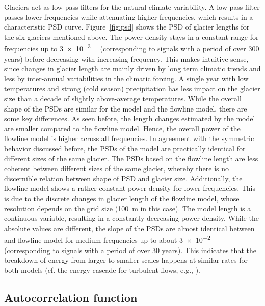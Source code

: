       Glaciers act as low-pass filters for the natural climate variability. A low pass filter passes lower frequencies while attenuating higher frequencies, which results in a characteristic PSD curve. Figure~\ref{fig:psd} shows the PSD of glacier lengths for the six glaciers mentioned above. The power density stays in a constant range for frequencies up to \SI{3e-3}{\per\year} (corresponding to signals with a period of over 300 years) before decreasing with increasing frequency. This makes intuitive sense, since changes in glacier length are mainly driven by long term climatic trends and less by inter-annual variabilities in the climatic forcing. A single year with low temperatures and strong (cold season) precipitation has less impact on the glacier size than a decade of slightly above-average temperatures.
      While the overall shape of the PSDs are similar for the \vas{} model and the flowline model, there are some key differences. As seen before, the length changes estimated by the \vas{} model are smaller compared to the flowline model. Hence, the overall power of the flowline model is higher across all frequencies. In agreement with the symmetric behavior discussed before, the PSDs of the \vas{} model are practically identical for different sizes of the same glacier. The PSDs based on the flowline length are less coherent between different sizes of the same glacier, whereby there is no discernible relation between shape of PSD and glacier size.
      Additionally, the flowline model shows a rather constant power density for lower frequencies. This is due to the discrete changes in glacier length of the flowline model, whose resolution depends on the grid size (\SI{100}{\meter} in this case). The \vas{} model length is a continuous variable, resulting in a constantly decreasing power density.
      While the absolute values are different, the slope of the PSDs are almost identical between \vas{} and flowline model for medium frequencies up to about \SI{3e-2}{\per\year} (corresponding to signals with a period of over 30 years). This indicates that the breakdown of energy from larger to smaller scales happens at similar rates for both models (cf. the energy cascade for turbulent flows, e.g., \cite{Wyngaard2010}).
    

    \subsection{Autocorrelation function} %
    \label{sub:autocorrelation_function_results}


